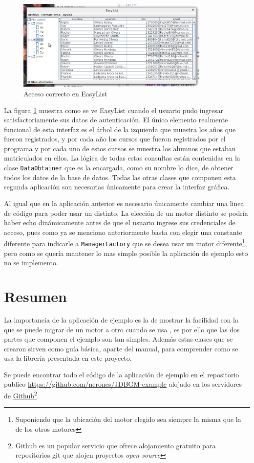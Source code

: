 \begin{figure}[h]
  \centering
    \includegraphics[width=0.85\textwidth]{figuras/ejemplo-c.png}
  \caption{Acceso correcto en EasyList}
  \label{fig:easylist}
\end{figure}

La figura \ref{fig:easylist} muestra como se ve EasyList cuando el usuario pudo ingresar satisfactoriamente sus datos de autenticación. El único elemento realmente funcional de esta interfaz es el árbol de la izquierda que muestra los años que fueron registrados, y por cada año los cursos que fueron registrados por el programa y por cada uno de estos cursos se muestra los alumnos que estaban matriculados en ellos. La lógica de todas estas consultas están contenidas en la clase \verb=DataObtainer= que es la encargada, como su nombre lo dice, de obtener todos los datos de la base de datos. Todas las otras clases que componen esta segunda aplicación son necesarias únicamente para crear la interfaz gráfica.

Al igual que en la aplicación anterior es necesario únicamente cambiar una linea de código para poder usar un \dd distinto. La elección de un motor distinto se podría haber echo dinámicamente  antes de que el usuario ingrese sus credenciales de acceso, pues como ya se menciono anteriormente basta con elegir una constante diferente para indicarle a \verb=ManagerFactory= que se desea usar un motor diferente\footnote{Suponiendo que la ubicación del motor elegido sea siempre la misma que la de los otros motores}, pero como se quería mantener lo mas simple posible la aplicación de ejemplo esto no se implemento.

\section{Resumen}
La importancia de la aplicación de ejemplo es la de mostrar la facilidad con la que se puede migrar de un motor a otro cuando se usa \jj, es por ello que las dos partes que componen el ejemplo son tan simples. Además estas clases que se crearon sirven como guía básica, aparte del manual, para comprender como se usa la librería presentada en este proyecto.

Se puede encontrar todo el código de la aplicación de ejemplo en el repositorio publico \url{https://github.com/nerones/JDBGM-example} alojado en los servidores de \href{https://github.com/}{Github}\footnote{Github es un popular servicio que ofrece alojamiento gratuito para repositorios git que alojen proyectos \textit{open source}}.